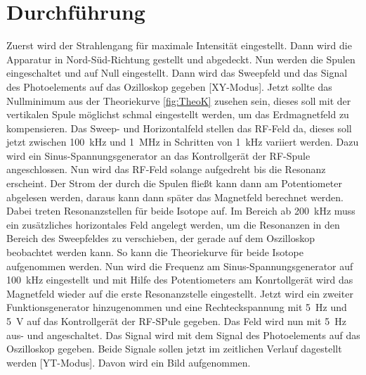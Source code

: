 \section{Durchführung}
\label{sec:Durchführung}
Zuerst wird der Strahlengang für maximale Intensität eingestellt. Dann wird die Apparatur in 
Nord-Süd-Richtung gestellt und abgedeckt. Nun werden die Spulen eingeschaltet und auf Null 
eingestellt. Dann wird das Sweepfeld und das Signal des Photoelements auf das Ozilloskop gegeben [XY-Modus]. 
Jetzt 
sollte das Nullminimum aus der Theoriekurve \ref{fig:TheoK} zusehen sein, dieses soll mit 
der vertikalen Spule möglichst schmal eingestellt werden, um das Erdmagnetfeld zu kompensieren. 
Das Sweep- und Horizontalfeld stellen das RF-Feld da, dieses soll jetzt zwischen 
\SI{100}{\kilo\hertz} und \SI{1}{\mega\hertz} in Schritten von \SI{1}{\kilo\hertz} 
variiert werden. Dazu wird ein Sinus-Spannungsgenerator an das Kontrollgerät der RF-Spule angeschlossen. 
Nun wird das RF-Feld solange aufgedreht bis die Resonanz erscheint. Der Strom der durch die 
Spulen fließt kann dann am Potentiometer abgelesen werden, daraus kann dann später das 
Magnetfeld berechnet werden. Dabei treten Resonanzstellen für beide Isotope auf. 
Im Bereich ab \SI{200}{\kilo\hertz} muss ein zusätzliches horizontales Feld angelegt werden, um 
die Resonanzen in den Bereich des Sweepfeldes zu verschieben, der gerade auf dem 
Oszilloskop beobachtet werden kann. So kann die Theoriekurve für beide Isotope aufgenommen werden.
\newline 
Nun wird die Frequenz am Sinus-Spannungsgenerator auf \SI{100}{\kilo\hertz} eingestellt und mit 
Hilfe des Potentiometers am Konrtollgerät wird das Magnetfeld wieder auf die erste Resonanzstelle 
eingestellt. Jetzt wird ein zweiter Funktionsgenerator hinzugenommen und eine Rechteckspannung 
mit \SI{5}{\hertz} und \SI{5}{\volt} auf das Kontrollgerät der RF-SPule gegeben. Das Feld wird 
nun mit \SI{5}{\hertz} aus- und angeschaltet. Das Signal wird mit dem Signal des Photoelements 
auf das Oszilloskop gegeben. 
Beide Signale sollen jetzt im zeitlichen Verlauf dagestellt werden [YT-Modus]. 
Davon wird ein Bild aufgenommen.

